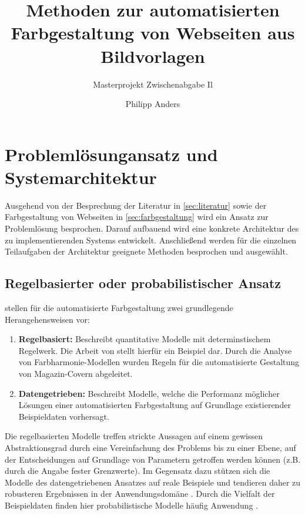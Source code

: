\documentclass[11pt, bibliography=totoc]{scrartcl}
\begin{document}
\title{Methoden zur automatisierten Farbgestaltung von Webseiten aus Bildvorlagen}
\subtitle{Masterprojekt Zwischenabgabe Il}
\author{Philipp Anders}

\maketitle

\begin{abstract}
\end{abstract}

\pagebreak
\tableofcontents
\pagebreak





\section{Problemlösungansatz und Systemarchitektur}
\label{sec:architecture}

Ausgehend von der Besprechung der Literatur in \autoref{sec:literatur} sowie der Farbgestaltung von Webseiten in \autoref{sec:farbgestaltung} wird ein Ansatz zur Problemlösung besprochen. Darauf aufbauend wird eine konkrete Architektur des zu implementierenden Systems entwickelt. Anschließend werden für die einzelnen Teilaufgaben der Architektur geeignete Methoden besprochen und ausgewählt.

\subsection{Regelbasierter oder probabilistischer Ansatz}

\citet{webpage} stellen für die automatisierte Farbgestaltung zwei grundlegende Herangehensweisen vor:

\begin{enumerate}
	\item \textbf{Regelbasiert:} Beschreibt quantitative Modelle mit determinstischem Regelwerk. Die Arbeit von \citet{magazines} stellt hierfür ein Beispiel dar. Durch die Analyse von Farbharmonie-Modellen wurden Regeln für die automatisierte Gestaltung von Magazin-Covern abgeleitet.
	\item \textbf{Datengetrieben:} Beschreibt Modelle, welche die Performanz möglicher Lösungen einer automatisierten Farbgestaltung auf Grundlage existierender Beispieldaten vorhersagt.
\end{enumerate}

Die regelbasierten Modelle treffen strickte Aussagen auf einem gewissen Abstraktionsgrad durch eine Vereinfachung des Problems bis zu einer Ebene, auf der Entscheidungen auf Grundlage von Parametern getroffen werden können (z.B. durch die Angabe fester Grenzwerte). Im Gegensatz dazu stützen sich die Modelle des datengetriebenen Ansatzes auf reale Beispiele und tendieren daher zu robusteren Ergebnissen in der Anwendungsdomäne \citep{webpage}. Durch die Vielfalt der Beispieldaten finden hier probabilistische Modelle häufig Anwendung \citep[siehe z.B.][]{webpage, patterns}.
\end{document}
